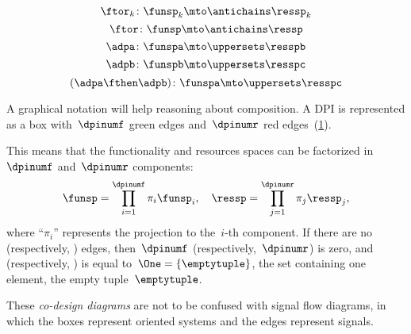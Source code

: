 {\begin{forslides}
\begin{equation*}
            \label{eq:dp_mob_4}
            \ftor_k\colon \funsp_k \mto \antichains \ressp_k
        \end{equation*}
        \begin{equation*}
            \label{eq:dp_mob_5}
            \ftor\colon \funsp \mto \antichains \ressp
        \end{equation*}
        \begin{equation*}
            \label{eq:dp_mob_6}
            \adpa\colon \funspa \mto \uppersets \resspb
        \end{equation*}
        \begin{equation*}
            \label{eq:dp_mob_7}
            \adpb\colon \funspb \mto \uppersets \resspc
        \end{equation*}
        \begin{equation*}
            \label{eq:dp_mob_8}
            (\adpa \fthen \adpb) \colon \funspa \mto \uppersets \resspc
        \end{equation*}
    \end{forslides}
}


A graphical notation will help reasoning about composition. A DPI is represented as a box with~$\dpinumf$ green edges and~$\dpinumr$ red edges~(\cref{fig:dp_graphical}).

\begin{figure}[h]
    \centering
    \caption{\label{fig:dp_graphical}}
\end{figure}


This means that the functionality and resources spaces can be factorized in~$\dpinumf$ and~$\dpinumr$ components:
\begin{equation*}
    \funsp=\prod_{i=1}^{\dpinumf}\pi_{i}\funsp_{i},\quad \ressp=\prod_{j=1}^{\dpinumr}\pi_{j}\ressp_{j},
\end{equation*}
where ``$\pi_{i}$'' represents the projection to the~$i$-th component.
If there are no  (respectively, ) edges, then~$\dpinumf$ (respectively,~$\dpinumr$) is zero, and \funsp (respectively, \ressp) is equal to~$\One=\{\emptytuple \}$, the set containing one element, the empty tuple~$\emptytuple$.

These \emph{co-design diagrams} are not to be confused with signal flow diagrams, in which the boxes represent oriented systems and the edges represent signals.



